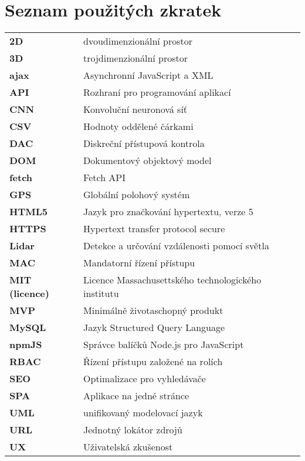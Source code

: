 \chapter*{Seznam použitých zkratek}

\begin{table}[h]
\begin{tabular}{ll}
\textbf{2D} & dvoudimenzionální prostor \\
\textbf{3D} & trojdimenzionální prostor \\
\textbf{ajax} & Asynchronní JavaScript a XML \\
\textbf{API} & Rozhraní pro programování aplikací \\
\textbf{CNN} & Konvoluční neuronová síť \\
\textbf{CSV} & Hodnoty oddělené čárkami \\
\textbf{DAC} & Diskreční přístupová kontrola \\
\textbf{DOM} & Dokumentový objektový model \\
\textbf{fetch} & Fetch API \\
\textbf{GPS} & Globální polohový systém \\
\textbf{HTML5} & Jazyk pro značkování hypertextu, verze 5 \\
\textbf{HTTPS} & Hypertext transfer protocol secure \\
\textbf{Lidar} & Detekce a určování vzdálenosti pomocí světla \\
\textbf{MAC} & Mandatorní řízení přístupu \\
\textbf{MIT (licence)} & Licence Massachusettského technologického institutu \\
\textbf{MVP} & Minimálně životaschopný produkt \\
\textbf{MySQL} & Jazyk Structured Query Language \\
\textbf{npmJS} & Správce balíčků Node.js pro JavaScript \\
\textbf{RBAC} & Řízení přístupu založené na rolích \\
\textbf{SEO} & Optimalizace pro vyhledávače \\
\textbf{SPA} & Aplikace na jedné stránce \\
\textbf{UML} & unifikovaný modelovací jazyk \\
\textbf{URL} & Jednotný lokátor zdrojů \\
\textbf{UX} & Uživatelská zkušenost
\end{tabular}
\end{table}
